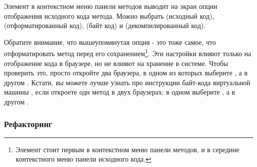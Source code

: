 \documentclass[a4paper,10pt,twoside]{book}
\begin{document}
Элемент  в контекстном меню панели методов выводит на экран опции отображения исходного кода метода.  Можно выбрать  (исходный код),  (отформатированный код),  (байт код) и  (декомпилированный код).


Обратите внимание, что вышеупомянутая опция  - это тоже самое, что отформатировать метод перед его сохранением\footnote{Элемент  стоит первым в контекстном меню панели методов, и в середине контекстного меню панели исходного кода.}. Эти настройки влияют только на отображение кода в браузере, но не влияют на хранение в системе. Чтобы проверить это, просто откройте два браузера, в одном из которых выберите , а в другом . Кстати, вы можете лучше узнать про инструкции байт-кода виртуальной машины \pharo, если откроете одн метод в двух браузерах: в одном выберите , а в другом .

\subsubsection{Рефакторинг}

\end{document}
